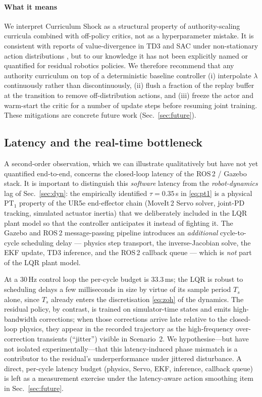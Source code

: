 \documentclass[conference]{IEEEtran}
\begin{document}
\paragraph*{What it means}
We interpret Curriculum Shock as a structural property of authority-scaling
curricula combined with off-policy critics, not as a hyperparameter
mistake. It is consistent with reports of value-divergence in TD3 and SAC
under non-stationary action distributions
\cite{Fujimoto2018,Kumar2020}, but to our knowledge it has not been
explicitly named or quantified for residual robotics policies. We therefore
recommend that any authority curriculum on top of a deterministic baseline
controller (i) interpolate $\lambda$ continuously rather than
discontinuously, (ii) flush a fraction of the replay buffer at the
transition to remove off-distribution actions, and (iii) freeze the actor
and warm-start the critic for a number of update steps before resuming
joint training. These mitigations are concrete future work
(Sec.~\ref{sec:future}).

\subsection{Latency and the real-time bottleneck}
A second-order observation, which we can illustrate qualitatively but
have not yet quantified end-to-end, concerns the closed-loop latency of
the ROS\,2 / Gazebo stack. It is important to distinguish this
\emph{software} latency from the \emph{robot-dynamics} lag of
Sec.~\ref{sec:dyn}: the empirically identified $\tau=0.35\,$s in
\eqref{eq:pt1} is a physical PT$_1$ property of the UR5e end-effector
chain (MoveIt\,2 Servo solver, joint-PD tracking, simulated actuator
inertia) that we deliberately included in the LQR plant model so that
the controller anticipates it instead of fighting it. The Gazebo and
ROS\,2 message-passing pipeline introduces an \emph{additional}
cycle-to-cycle scheduling delay --- physics step transport, the
inverse-Jacobian solve, the EKF update, TD3 inference, and the ROS\,2
callback queue --- which is \emph{not} part of the LQR plant model.

At a $30\,$Hz control loop the per-cycle budget is $33.3\,$ms; the LQR
is robust to scheduling delays a few milliseconds in size by virtue of
its sample period $T_s$ alone, since $T_s$ already enters the
discretisation \eqref{eq:zoh} of the dynamics. The residual policy, by
contrast, is trained on simulator-time states and emits high-bandwidth
corrections; when those corrections arrive late relative to the
closed-loop physics, they appear in the recorded trajectory as the
high-frequency over-correction transients (``jitter'') visible in
Scenario~2. We hypothesise---but have not isolated experimentally---that
this latency-induced phase mismatch is a contributor to the residual's
underperformance under jittered disturbance. A direct, per-cycle latency
budget (physics, Servo, EKF, inference, callback queue) is left as a
measurement exercise under the latency-aware action smoothing item in
Sec.~\ref{sec:future}.
\end{document}
